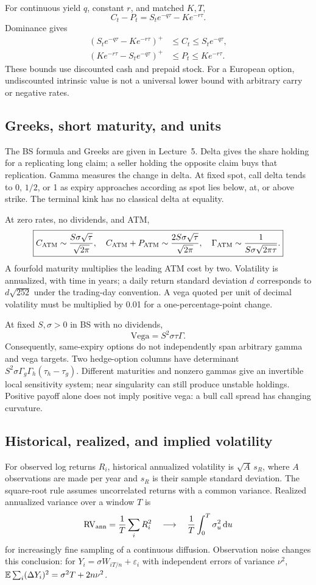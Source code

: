 For continuous yield \(q\), constant \(r\), and matched \(K,T\),
\[
\boxed{C_t-P_t=S_t e^{-q\tau}-Ke^{-r\tau}.}
\]
Dominance gives
\[
\begin{aligned}
(S_t e^{-q\tau}-Ke^{-r\tau})^+&\leq C_t\leq S_t e^{-q\tau},\\
(Ke^{-r\tau}-S_t e^{-q\tau})^+&\leq P_t\leq Ke^{-r\tau}.
\end{aligned}
\]
These bounds use discounted cash and prepaid stock. For a European option,
undiscounted intrinsic value is not a universal lower bound with arbitrary
carry or negative rates.

\subsection{Greeks, short maturity, and units}
The BS formula and Greeks are given in Lecture~5. Delta gives the share
holding for a replicating long claim; a seller holding the opposite claim
buys that replication. Gamma measures the change in delta. At fixed spot,
call delta tends to 0, \(1/2\), or 1 as expiry approaches according as
spot lies below, at, or above strike. The terminal kink has no classical
delta at equality.

At zero rates, no dividends, and ATM,
\[
\boxed{C_{\rm ATM}\sim\frac{S\sigma\sqrt\tau}{\sqrt{2\pi}},\quad
C_{\rm ATM}+P_{\rm ATM}\sim\frac{2S\sigma\sqrt\tau}{\sqrt{2\pi}},\quad
\Gamma_{\rm ATM}\sim\frac1{S\sigma\sqrt{2\pi\tau}}.}
\]
A fourfold maturity multiplies the leading ATM cost by two. Volatility is
annualized, with time in years; a daily return standard deviation \(d\)
corresponds to \(d\sqrt{252}\) under the trading-day convention. A vega
quoted per unit of decimal volatility must be multiplied by 0.01 for a
one-percentage-point change.

At fixed \(S,\sigma>0\) in BS with no dividends,
\[
\boxed{\mathrm{Vega}=S^2\sigma\tau\Gamma.}
\]
Consequently, same-expiry options do not independently span arbitrary
gamma and vega targets. Two hedge-option columns have determinant
\(S^2\sigma\Gamma_g\Gamma_h(\tau_h-\tau_g)\). Different maturities and
nonzero gammas give an invertible local sensitivity system; near
singularity can still produce unstable holdings. Positive payoff alone
does not imply positive vega: a bull call spread has changing curvature.

\subsection{Historical, realized, and implied volatility}
For observed log returns \(R_i\), historical annualized volatility is
\(\sqrt A\,s_R\), where \(A\) observations are made per year and
\(s_R\) is their sample standard deviation. The square-root rule assumes
uncorrelated returns with a common variance. Realized annualized variance
over a window \(T\) is
\[
\mathrm{RV}_{\rm ann}=\frac1T\sum_iR_i^2
\quad\longrightarrow\quad\frac1T\int_0^T\sigma_u^2\,\mathrm{d} u
\]
for increasingly fine sampling of a continuous diffusion. Observation
noise changes this conclusion: for \(Y_i=\sigma W_{iT/n}+\varepsilon_i\)
with independent errors of variance \(\nu^2\),
\(\mathbb{E}\sum_i(\Delta Y_i)^2=\sigma^2T+2n\nu^2\).

